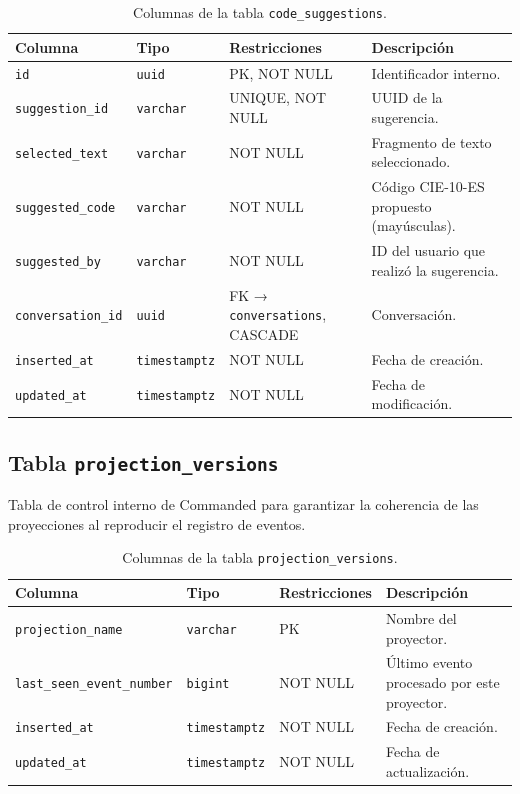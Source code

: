 \begin{table}[h]
\centering
\caption{Columnas de la tabla \texttt{code\_suggestions}.}
\label{tab:suggestions}
\begin{tabular}{llp{3.5cm}p{4.5cm}}
\hline
\textbf{Columna} & \textbf{Tipo} & \textbf{Restricciones} & \textbf{Descripción} \\
\hline
\texttt{id}               & \texttt{uuid}    & PK, NOT NULL     & Identificador interno. \\
\texttt{suggestion\_id}   & \texttt{varchar} & UNIQUE, NOT NULL & UUID de la sugerencia. \\
\texttt{selected\_text}   & \texttt{varchar} & NOT NULL         & Fragmento de texto seleccionado. \\
\texttt{suggested\_code}  & \texttt{varchar} & NOT NULL         & Código CIE-10-ES propuesto (mayúsculas). \\
\texttt{suggested\_by}    & \texttt{varchar} & NOT NULL         & ID del usuario que realizó la sugerencia. \\
\texttt{conversation\_id} & \texttt{uuid}    & FK → \texttt{conversations}, CASCADE & Conversación. \\
\texttt{inserted\_at}     & \texttt{timestamptz} & NOT NULL     & Fecha de creación. \\
\texttt{updated\_at}      & \texttt{timestamptz} & NOT NULL     & Fecha de modificación. \\
\hline
\end{tabular}
\end{table}

\subsection{Tabla \texttt{projection\_versions}}

Tabla de control interno de Commanded para garantizar la coherencia de las proyecciones al reproducir el registro de eventos.

\begin{table}[h]
\centering
\caption{Columnas de la tabla \texttt{projection\_versions}.}
\label{tab:proj-versions}
\begin{tabular}{p{3.5cm}lp{3cm}p{4cm}}
\hline
\textbf{Columna} & \textbf{Tipo} & \textbf{Restricciones} & \textbf{Descripción} \\
\hline
\texttt{projection\_name}         & \texttt{varchar} & PK          & Nombre del proyector. \\
\texttt{last\_seen\_event\_\allowbreak{}number}& \texttt{bigint}  & NOT NULL    & Último evento procesado por este proyector. \\
\texttt{inserted\_at}             & \texttt{timestamptz} & NOT NULL & Fecha de creación. \\
\texttt{updated\_at}              & \texttt{timestamptz} & NOT NULL & Fecha de actualización. \\
\hline
\end{tabular}
\end{table}

